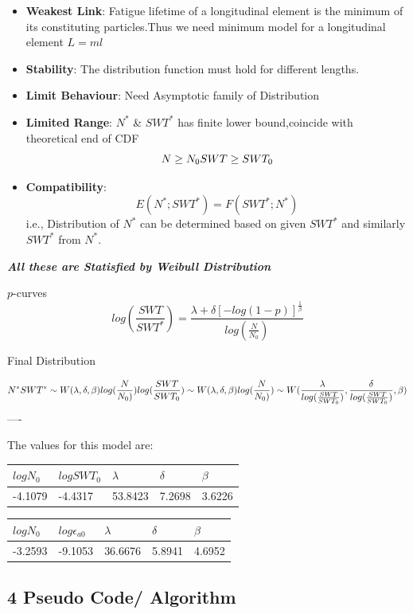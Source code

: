 \documentclass[11pt]{article}
\begin{document}
\begin{itemize}
\item
  \textbf{Weakest Link}: Fatigue lifetime of a longitudinal element is
  the minimum of its constituting particles.Thus we need minimum model
  for a longitudinal element \(L = ml\)
\item
  \textbf{Stability}: The distribution function must hold for different
  lengths.
\item
  \textbf{Limit Behaviour}: Need Asymptotic family of Distribution
\item
  \textbf{Limited Range}: \(N^*\) \& \(SWT^*\) has finite lower
  bound,coincide with theoretical end of CDF \[
  N\geq N_0 \\
  SWT \geq SWT_0 
  \]
\item
  \textbf{Compatibility}: \[E(N^*;SWT^*) = F(SWT^*;N^*)\] i.e.,
  Distribution of \(N^*\) can be determined based on given \(SWT^*\) and
  similarly \(SWT^*\) from \(N^*\).
\end{itemize}

\textbf{\emph{All these are Statisfied by Weibull Distribution}}

\(p\)-curves \[
log(\frac{SWT}{SWT^*}) = \frac{\lambda + \delta[-log(1-p)]^{\frac{1}{\beta}}}{log(\frac{N}{N_0})}
\]

Final Distribution

\[
N^*SWT^* \sim W(\lambda,\delta,\beta) \\
log(\frac{N}{N_0)})log(\frac{SWT}{SWT_0}) \sim W(\lambda,\delta,\beta) \\
log(\frac{N}{N_0)})\sim W(\frac{\lambda}{log(\frac{SWT}{SWT_0}) },\frac{\delta}{log(\frac{SWT}{SWT_0}) },\beta) 
\] ----

The values for this model are:

\begin{longtable}[]{@{}lllll@{}}
\toprule
\(logN_0\) & \(logSWT_0\) & \(\lambda\) & \(\delta\) &
\(\beta\)\tabularnewline
\midrule
\endhead
-4.1079 & -4.4317 & 53.8423 & 7.2698 & 3.6226\tabularnewline
\bottomrule
\end{longtable}

\begin{longtable}[]{@{}lllll@{}}
\toprule
\(logN_0\) & \(log\epsilon_{a0}\) & \(\lambda\) & \(\delta\) &
\(\beta\)\tabularnewline
\midrule
\endhead
-3.2593 & -9.1053 & 36.6676 & 5.8941 & 4.6952\tabularnewline
\bottomrule
\end{longtable}

\hypertarget{pseudo-code-algorithm}{%
\subsection{4 Pseudo Code/ Algorithm}\label{pseudo-code-algorithm}}
\end{document}
